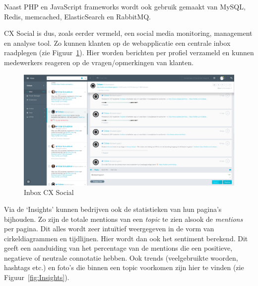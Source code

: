 Naast PHP en JavaScript frameworks wordt ook gebruik gemaakt van MySQL, Redis, memcached, ElasticSearch en RabbitMQ. 

CX Social is dus, zoals eerder vermeld, een social media monitoring, management en analyse tool. Zo kunnen klanten op de webapplicatie een centrale inbox raadplegen (zie Figuur~\ref{fig:Inbox}). Hier worden berichten per profiel verzameld en kunnen medewerkers reageren op de vragen/opmerkingen van klanten. 

\begin{figure}[H]
	\centering
	\includegraphics[width=1\textwidth]{Figuren/Inbox.png}
	\caption{Inbox CX Social \cite{EngagorScreenshots}} %
	\label{fig:Inbox}
\end{figure} 

Via de `Insights' kunnen bedrijven ook de statistieken van hun pagina's bijhouden. Zo zijn de totale mentions van een \textit{topic} te zien alsook de \textit{mentions} per pagina. Dit alles wordt zeer intu\"{i}tief  weergegeven in de vorm van cirkeldiagrammen en tijdlijnen. Hier wordt dan ook het sentiment berekend. Dit geeft een aanduiding van het percentage van de mentions die een positieve, negatieve of neutrale connotatie hebben. Ook trends (veelgebruikte woorden, hashtags  etc.) en foto's die binnen een topic voorkomen zijn hier te vinden (zie Figuur~\ref{fig:Insights}).  

